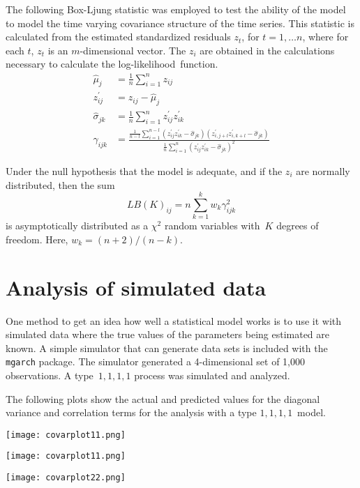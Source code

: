 {The following Box-Ljung
statistic was employed 
to test the ability of the model to model the time varying covariance
structure of the time series. This statistic is calculated from the
estimated standardized residuals $z_t$, for $t=1,\ldots n$,
where for each $t$, $z_t$ is an $m$-dimensional vector.
The $z_i$ are obtained in the calculations necessary to calculate the
log-likelihood~\mbox{function}.
\begin{align}
  \hat\mu_j&=\frac{1}{ n}\sum_{i=1}^n z_{ij}\\
  z_{ij}^{\prime}&=z_{ij}-\hat\mu_j\\
  \hat\sigma_{jk}&=\frac{1}{ n}\sum_{i=1}^n z_{ij}^\prime z_{ik}^\prime\\
  \gamma_{ijk}&=
       \frac{
            \frac{1}{ n-l}\sum_{i=1}^{n-l}
         (z_{ij}^\prime z_{ik}^\prime-\hat\sigma_{jk})
         (z_{i,j+l}^\prime z_{i,k+l}^\prime-\hat\sigma_{jk})
            }{                              
            \frac{1}{ n}\sum_{i=1}^n
         (z_{ij}^\prime z_{ik}^\prime-\hat\sigma_{jk})^2
       }
\end{align}

Under the null hypothesis that the model is adequate, and if the
$z_i$ are normally distributed, then the sum
$$LB(K)_{ij}=n\sum_{k=1}^k w_k \gamma_{ijk}^2$$
is asymptotically distributed as a $\chi^2$ random variables 
with~$K$ degrees of freedom. Here, $w_k=(n+2)/(n-k)$.


\section{Analysis of simulated data}

One method to get an idea how well a statistical model works is to
use it with simulated data where the true values of the parameters being estimated
are known.
A simple simulator that can generate data sets is included with the
\texttt{mgarch} package. The simulator generated a 4-dimensional set of
1,000 observations. A type~$1,1,1,1$ process was simulated and
analyzed.

The following plots show the actual and predicted values for the
diagonal variance and correlation terms for the analysis with
a type $1,1,1,1$~model.

\texttt{[image: covarplot11.png]}



\texttt{[image: covarplot11.png]}

\texttt{[image: covarplot22.png]}

}

